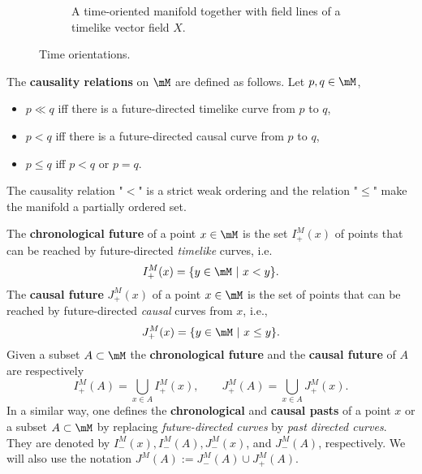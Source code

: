\begin{figure}[h]
\begin{subfigure}{.5\textwidth}
	\caption{A time-oriented manifold together with field lines of a timelike vector field $X$.}
	\end{subfigure}
	\label{fig:timemanif}
	\caption{Time orientations.}
\end{figure}

The \textbf{causality relations} on $\mM$ are defined as follows. Let $p,q\in\mM$,
\begin{itemize}
	\item $p\ll q$ iff there is a future-directed timelike curve from $p$ to $q$,
	\item $p< q$ iff there is a future-directed causal curve from $p$ to $q$,
	\item $p\le q$ iff $p<q$ or $p=q$.
\end{itemize}
The causality relation "$<$" is a strict weak ordering and the relation "$\le$" make the manifold a partially ordered set.\\

\begin{definition}
	The \textbf{chronological future} of a point $x\in\mM$ is the set $I_+^M(x)$ of points that can be reached by future-directed \textsl{timelike} curves, i.e.
	\[		I_+^M(x)=\{y\in\mM\ |\ x<y\}.	\]
	The \textbf{causal future} $J_+^M(x)$ of a point $x\in\mM$ is the set of points that can be reached by future-directed \textsl{causal} curves from $x$, i.e.,
	\[	J_+^M(x)=\{y\in\mM\ |\ x\le y\}.	\]
	Given a subset $A\subset \mM$ the \textbf{chronological future} and the \textbf{causal future} of $A$ are respectively
	\[	I_+^M(A)=\bigcup_{x\in A}I_+^M(x),\qquad J_+^M(A)=\bigcup_{x\in A}J_+^M(x).	\]
	In a similar way, one defines the \textbf{chronological} and \textbf{causal pasts} of a point $x$ or a subset $A \subset \mM$ by replacing \textsl{future-directed curves} by \textsl{past directed curves}. They are denoted by $I_-^M (x), I_-^M (A), J_-^M (x)$, and $J_-^M (A)$, respectively. We will also use the notation $J^M (A) := J_-^M (A) \cup J_+^M (A)$.
\end{definition}

